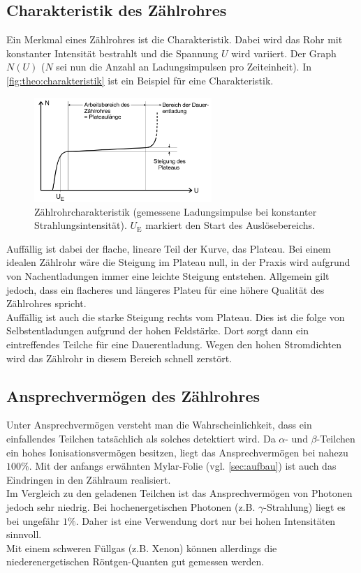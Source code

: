 \subsection{Charakteristik des Zählrohres}
\label{sec:theo:charakteristik}

Ein Merkmal eines Zählrohres ist die Charakteristik. Dabei wird das Rohr mit konstanter Intensität bestrahlt und
die Spannung $U$ wird variiert. Der Graph $N(U)$ ($N$ sei nun die Anzahl an Ladungsimpulsen pro Zeiteinheit). In
\autoref{fig:theo:charakteristik} ist ein Beispiel für eine Charakteristik.
\begin{figure}[H]
	\centering
	\includegraphics[width=0.6\textwidth]{content/charakteristik.png}
	\caption{Zählrohrcharakteristik (gemessene Ladungsimpulse bei konstanter Strahlungsintensität). $U_\text{E}$
	markiert den Start des Auslösebereichs. \cite{sample}}
	\label{fig:theo:charakteristik}
\end{figure}

\noindent
Auffällig ist dabei der flache, lineare Teil der Kurve, das Plateau. Bei einem idealen Zählrohr wäre die Steigung
im Plateau null, in der Praxis wird aufgrund von Nachentladungen immer eine leichte Steigung entstehen. Allgemein gilt
jedoch, dass ein flacheres und längeres Plateu für eine höhere Qualität des Zählrohres spricht.
\\
Auffällig ist auch die starke Steigung rechts vom Plateau. Dies ist die folge von Selbstentladungen aufgrund 
der hohen Feldstärke. Dort sorgt dann ein eintreffendes Teilche für eine Dauerentladung. Wegen den hohen Stromdichten
wird das Zählrohr in diesem Bereich schnell zerstört.

\subsection{Ansprechvermögen des Zählrohres}
\label{sec:theo:ansprechvermoegen}

Unter Ansprechvermögen versteht man die Wahrscheinlichkeit, dass ein einfallendes Teilchen tatsächlich als solches 
detektiert wird. Da $\alpha$- und $\beta$-Teilchen ein hohes Ionisationsvermögen besitzen, liegt das Ansprechvermögen
bei nahezu $100\%$. Mit der anfangs erwähnten Mylar-Folie (vgl. \autoref{sec:aufbau}) ist auch das Eindringen in
den Zählraum realisiert.
\\
Im Vergleich zu den geladenen Teilchen ist das Ansprechvermögen von Photonen jedoch sehr niedrig. Bei hochenergetischen
Photonen (z.B. $\gamma$-Strahlung) liegt es bei ungefähr $1\%$. Daher ist eine Verwendung dort nur bei hohen 
Intensitäten sinnvoll.
\\
Mit einem schweren Füllgas (z.B. Xenon) können allerdings die niederenergetischen Röntgen-Quanten gut gemessen werden.

